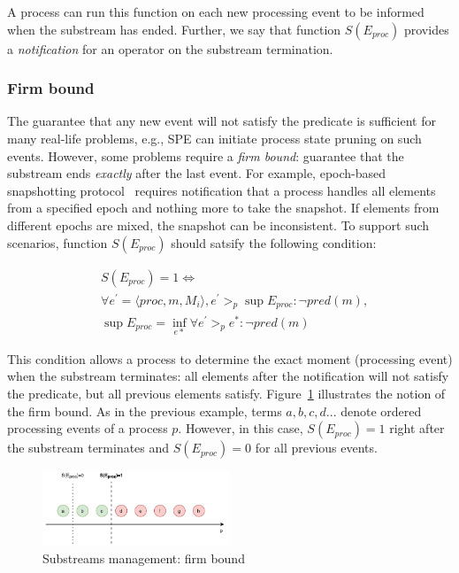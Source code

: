 A process can run this function on each new processing event to be informed when the substream has ended. Further, we say that function $S(E_{proc})$ provides a {\em notification} for an operator on the substream termination.

\subsubsection{Firm bound}

The guarantee that any new event will not satisfy the predicate is sufficient for many real-life problems, e.g., SPE can initiate process state pruning on such events. However, some problems require a {\em firm bound}: guarantee that the substream ends {\em exactly} after the last event. For example, epoch-based snapshotting protocol~\cite{2015arXiv150608603C, jacques2016consistent} requires notification that a process handles all elements from a specified epoch and nothing more to take the snapshot. If elements from different epochs are mixed, the snapshot can be inconsistent. To support such scenarios, function $S(E_{proc})$ should satsify the following condition:

\begin{align*}
& S(E_{proc}) = 1  \Longleftrightarrow \\
& \forall e^{'} = \langle proc,m,M_i\rangle, e^{'} >_p \sup E_{proc} : \neg pred(m), \\
& \sup E_{proc} = \inf_{e*} \forall e^{'} >_p e^{*} : \neg pred(m) 
\end{align*}

This condition allows a process to determine the exact moment (processing event) when the substream terminates: all elements after the notification will not satisfy the predicate, but all previous elements satisfy. Figure~\ref{strict_guarantees} illustrates the notion of the firm bound. As in the previous example, terms $a,b,c,d...$ denote ordered processing events of a process $p$. However, in this case, $S(E_{proc})=1$ right after the substream terminates and $S(E_{proc})=0$ for all previous events.

\begin{figure}[htbp]
  \centering
  \includegraphics[width=0.50\textwidth]{pics/strict-guarantee.pdf}
  \caption{Substreams management: firm bound}
  \label{strict_guarantees}
\end{figure}

